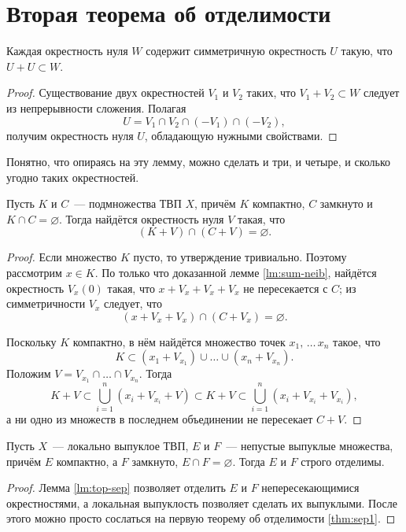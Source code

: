 \documentclass{notes}
\begin{document}
\section{Вторая теорема об отделимости}

	\begin{lm} \label{lm:sum-neib}
		Каждая окрестность нуля $W$ содержит симметричную окрестность $U$ такую, что $U + U \subset W$.
		\begin{proof}
			Существование двух окрестностей $V_1$ и $V_2$ таких, что $V_1 + V_2 \subset W$ следует из непрерывности сложения. Полагая
			\[
				U = V_1 \cap V_2 \cap (-V_1) \cap (-V_2),
			\]
			получим окрестность нуля $U$, обладающую нужными свойствами.
		\end{proof}
	\end{lm}

	\begin{rem}
		Понятно, что опираясь на эту лемму, можно сделать и три, и четыре, и сколько угодно таких окрестностей.
	\end{rem}

	\begin{lm} \label{lm:top-sep}
		Пусть $K$ и $C$~--- подмножества ТВП $X$, причём $K$ компактно, $C$ замкнуто и $K \cap C = \varnothing$. Тогда найдётся окрестность нуля $V$ такая, что
		\[
			(K + V) \cap (C + V) = \varnothing.
		\]
		\begin{proof}
			Если множество $K$ пусто, то утверждение тривиально. Поэтому рассмотрим $x \in K$. По только что доказанной лемме \ref{lm:sum-neib}, найдётся окрестность $V_x(0)$ такая, что $x + V_x + V_x + V_x$ не пересекается с $C$; из симметричности $V_x$ следует, что
			\[
				(x + V_x + V_x) \cap (C + V_x) = \varnothing.
			\]

			Поскольку $K$ компактно, в нём найдётся множество точек $x_1, \, \ldots\, x_n$ такое, что
			\[
				K \subset (x_1 + V_{x_1}) \cup \ldots \cup (x_n + V_{x_n}).
			\]
			Положим $V = V_{x_1} \cap \ldots \cap V_{x_n}$. Тогда
			\[
				K + V \subset \bigcup\limits_{i = 1}^n (x_i + V_{x_i} + V) \subset K + V \subset \bigcup\limits_{i = 1}^n (x_i + V_{x_i} + V_{x_i}),
			\]
			а ни одно из множеств в последнем объединении не пересекает $C + V$.
		\end{proof}
	\end{lm}

	\begin{thm} \label{thm:sep2}
		Пусть $X$~--- локально выпуклое ТВП, $E$ и $F$~--- непустые выпуклые множества, причём $E$ компактно, а $F$ замкнуто, $E \cap F = \varnothing$. Тогда $E$ и $F$ строго отделимы.
		\begin{proof}
			Лемма \ref{lm:top-sep} позволяет отделить $E$ и $F$ непересекающимися окрестностями, а локальная выпуклость позволяет сделать их выпуклыми. После этого можно просто сослаться на первую теорему об отделимости \ref{thm:sep1}.
		\end{proof}
	\end{thm}
\end{document}
